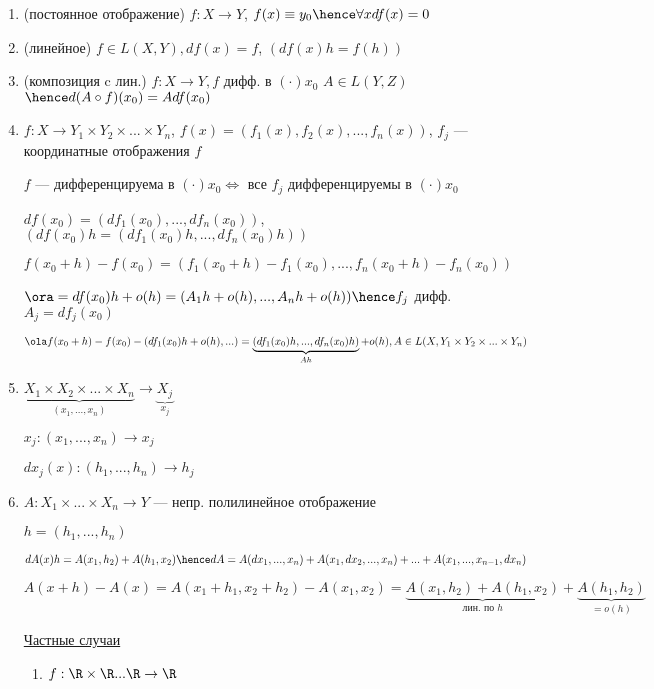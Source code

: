 \begin{examples}
\begin{enumerate}
    \item (постоянное отображение) $f: X \to Y$, $f(x) \equiv y_0 \hence \forall x df(x) = 0$
    \item (линейное) $f \in L(X, Y), df(x) = f$, $(df(x)h = f(h))$
    \item (композиция c лин.) $f : X \to Y, f$ дифф. в $(\cdot) x_0$ $A \in L(Y, Z)$ 
        $ \hence d(A \circ f)(x_0) = Adf(x_0)$
    \item $f : X \to Y_1 \times Y_2 \times ... \times Y_n$, $f(x) = (f_1(x), f_2(x), ..., f_n(x))$, $f_j$ --- координатные отображения $f$
    
    $f$ --- дифференцируема в $(\cdot) x_0 \Longleftrightarrow $ все $f_j $ дифференцируемы в $(\cdot) x_0$

    $df(x_0) = (df_1(x_0), ..., df_n(x_0))$, $\left( df(x_0)h = (df_1(x_0)h, ..., df_n(x_0)h) \right)$

    $f(x_0 + h) - f(x_0) = (f_1(x_0 + h) - f_1(x_0), ... , f_n(x_0 + h) - f_n(x_0))$

    $\ora = df(x_0)h + o(h) = (A_1h + o(h), ... , A_nh + o(h)) \hence f_j$ дифф. $A_j = df_j(x_0)$

    $\ola f(x_0 + h) - f(x_0) - (df_1(x_0)h + o(h), ... ) = \underbrace{(df_1(x_0) h, ... , df_n(x_0) h)}_{Ah} + o(h), A \in L(X, Y_1 \times Y_2 \times ... \times Y_n)$


    \item $\underbrace{X_1 \times X_2 \times ... \times X_n }_{(x_1, ... , x_n)}\to \underbrace{X_j}_{x_j}$
    
    $x_j : (x_1, ..., x_n) \to x_j$

    $dx_j(x) : (h_1, ..., h_n) \to h_j$
            
    \item $A : X_1 \times ... \times X_n \to Y$ --- непр. полилинейное отображение
    
    $h = (h_1, ..., h_n)$

    $dA(x)h = A(x_1, h_2) + A(h_1, x_2) \hence dA = A(dx_1, ..., x_n) + A(x_1, dx_2, ..., x_n) + ... + A(x_1, ..., x_{n- 1}, dx_n)$

    $A(x + h) - A(x) = A(x_1 + h_1, x_2 + h_2) - A(x_1, x_2) = \underbrace{A(x_1, h_2) + A(h_1, x_2)}_{\text{лин. по } h} + \underbrace{A(h_1, h_2)}_{=o(h)}$

    \underline{Частные случаи} 

    \begin{enumerate}
        \item $f : \R \times \R ... \R \to \R$
        

\end{enumerate}
\end{enumerate}
\end{examples}
